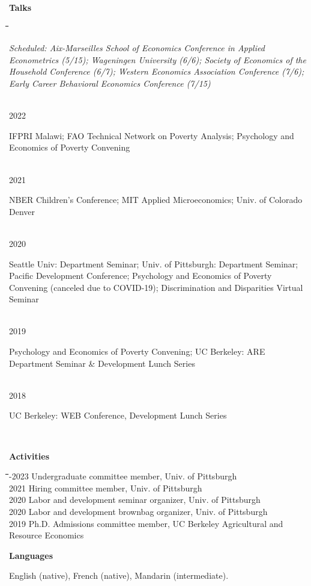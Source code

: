 \documentclass[10pt, oneside]{article}
\makeatletter
\newlength\tdima
\newcommand\tabfill[1]{%
      \setlength\tdima{\linewidth}%
      \addtolength\tdima{\@totalleftmargin}%
      \addtolength\tdima{-\dimen\@curtab}%
      \parbox[t]{\tdima}{#1\ifhmode\strut\fi}}
\newcommand\mytabs{\hspace*{1cm}\=\hspace{1cm}\=\hspace{1cm}\=\hspace{1cm}\=\hspace{1cm}\=\hspace{1cm}\=\hspace{1cm}\=\hspace{1cm}\=\hspace{1cm}\=\hspace{1cm}}
\newenvironment{mysec}[1][\mytabs]
  {\begin{tabbing}#1\kill\ignorespaces}
  {\end{tabbing}}
\makeatother
\begin{document}
\begin{minipage}[t]{0.1\linewidth}
\textbf{Talks}
\end{minipage}\hspace{0.05\linewidth}
\begin{minipage}[t]{0.8\linewidth}
\begin{mysec} 
	2023\>\> \tabfill{ \textit{Scheduled: Aix-Marseilles School of Economics Conference in Applied Econometrics (5/15); Wageningen University (6/6); Society of Economics of the Household Conference (6/7); Western Economics Association Conference (7/6); Early Career Behavioral Economics Conference (7/15)} } \\
	2022\>\> \tabfill{ IFPRI Malawi; FAO Technical Network on Poverty Analysis; Psychology and Economics of Poverty Convening} \\
	2021\>\> \tabfill{ NBER Children's Conference; MIT Applied Microeconomics; Univ. of Colorado Denver} \\
	2020\>\> \tabfill{Seattle Univ: Department Seminar; Univ. of Pittsburgh: Department Seminar; Pacific  Development Conference; Psychology and Economics of Poverty Convening (canceled due to COVID-19); Discrimination and Disparities Virtual Seminar } \\
	2019\>\> \tabfill{Psychology and Economics of Poverty Convening; UC Berkeley: ARE Department Seminar \& Development Lunch Series} \\
	2018\>\> \tabfill{UC Berkeley: WEB Conference,  Development Lunch Series} \\
\end{mysec} 
\end{minipage}\vspace{4mm}


\begin{minipage}[t]{0.1\linewidth}
\textbf{Activities}
\end{minipage}\hspace{0.05\linewidth}
\begin{minipage}[t]{0.8\linewidth}
\begin{mysec}
2021-2023 \>\> Undergraduate committee member, Univ. of Pittsburgh\\
2021 \>\> Hiring committee member, Univ. of Pittsburgh\\
2020 \>\> Labor and development seminar organizer, Univ. of Pittsburgh\\
2020 \>\> Labor and development brownbag organizer, Univ. of Pittsburgh\\
2019 \>\> Ph.D. Admissions committee member, UC Berkeley Agricultural and Resource Economics\\

\end{mysec}
\end{minipage}\vspace{4mm}

\begin{minipage}[t]{0.1\linewidth}
\textbf{Languages}
\end{minipage}\hspace{0.05\linewidth}
\begin{minipage}[t]{0.8\linewidth}
English (native), French (native), Mandarin (intermediate).
\end{minipage}\vspace{5mm}
\end{document}
